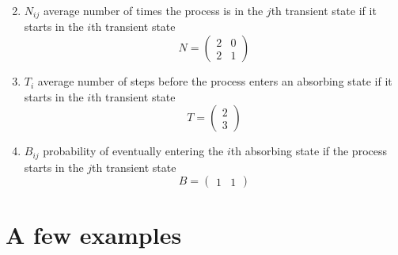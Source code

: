 \documentclass[aspectratio=169]{beamer}\usepackage[]{graphicx}\usepackage[]{xcolor}
\begin{document}
\begin{frame}
\begin{enumerate}
\setcounter{enumi}{1}
\item $N_{ij}$ average number of times the process is in the $j$th transient state if it starts in the $i$th transient state
\[
N=
\begin{pmatrix}
2 & 0 \\
2 & 1
\end{pmatrix}
\]
\vfill
\item $T_i$ average number of steps before the process enters an absorbing state if it starts in the $i$th transient state
\[
T=\begin{pmatrix}
2\\
3
\end{pmatrix}
\]
\vfill
\item $B_{ij}$ probability of eventually entering the $i$th absorbing state if the process starts in the $j$th transient state
\[
B=
\begin{pmatrix}
	1 & 1
\end{pmatrix}
\]
\end{enumerate}
\vfill
\end{frame}


\section{A few examples}
\end{document}
